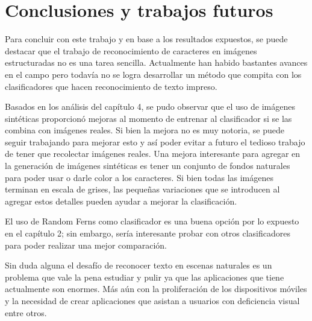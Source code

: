 \newpage
\section{Conclusiones y trabajos futuros}

	Para concluir con este trabajo y en base a los resultados expuestos, se puede destacar que el trabajo de reconocimiento de caracteres en imágenes estructuradas no es una tarea sencilla. Actualmente han habido bastantes avances en el campo pero todavía no  se logra desarrollar un método que compita con los clasificadores que hacen reconocimiento de texto impreso.
	
	Basados en los análisis del capítulo 4, se pudo observar que el uso de imágenes sintéticas proporcionó mejoras al momento de entrenar al clasificador si se las combina con imágenes reales. Si bien la mejora no es muy notoria, se puede seguir trabajando para mejorar esto y así poder evitar a futuro el tedioso trabajo de tener que recolectar imágenes reales. Una mejora interesante para agregar en la generación de imágenes sintéticas es tener un conjunto de fondos naturales para poder usar o darle color a los caracteres. Si bien todas las imágenes terminan en escala de grises, las pequeñas variaciones que se introducen al agregar estos detalles pueden ayudar a mejorar la clasificación.
	
	El uso de Random Ferns como clasificador es una buena opción por lo expuesto en el capítulo 2; sin embargo, sería interesante probar con otros clasificadores para poder realizar una mejor comparación.
	
	Sin duda alguna el desafío de reconocer texto en escenas naturales es un problema que vale la pena estudiar y pulir ya que las aplicaciones que tiene actualmente son enormes. Más aún con la proliferación de los dispositivos móviles y la necesidad de crear aplicaciones que asistan a usuarios con deficiencia visual entre otros.